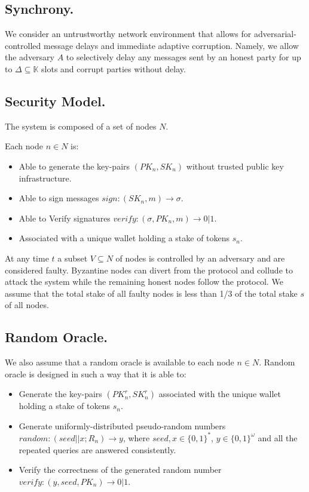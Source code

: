 \subsection{Synchrony.}\label{subsec:synchrony.}
We consider an untrustworthy network environment that allows for adversarial-controlled message delays and immediate adaptive corruption.
Namely, we allow the adversary $A$ to selectively delay any messages sent by an honest party for up to $\Delta \subseteq \mathbb{K}$ slots and corrupt parties without delay.

\subsection{Security Model.}\label{subsec:security-model.}
The system is composed of a set of nodes $N$.

Each node $n \in N$ is:
\begin{itemize}
    \item Able to generate the key-pairs ${(PK_n, SK_n)}$ without trusted public key infrastructure.
    \item Able to sign messages ${sign: (SK_n, m) \rightarrow \sigma}$.
    \item Able to Verify signatures ${verify: (\sigma, PK_n, m) \rightarrow 0 | 1}$.
    \item Associated with a unique wallet holding a stake of tokens $s_n$.
\end{itemize}

At any time $t$ a subset ${V \subseteq N}$ of nodes is controlled by an adversary and are considered faulty.
Byzantine nodes can divert from the protocol and collude to attack the system while the remaining honest nodes follow the protocol.
We assume that the total stake of all faulty nodes is less than 1/3 of the total stake $s$ of all nodes.

\subsection{Random Oracle.}\label{subsec:random-oracle.}
We also assume that a random oracle is available to each node $n \in N$.
Random oracle is designed in such a way that it is able to:
\begin{itemize}
    \item Generate the key-pairs ${(PK^r_n, SK^r_n)}$ associated with the unique wallet holding a stake of tokens $s_n$.
    \item Generate uniformly-distributed pseudo-random numbers ${random: (seed || x; R_n) \rightarrow y}$, where ${seed, x \in \{0,1\}^*}$, ${y \in \{0,1\}^\omega}$ and all the repeated queries are answered consistently.
    \item Verify the correctness of the generated random number ${verify: (y, seed, PK_n) \rightarrow 0 | 1}$.
\end{itemize}

